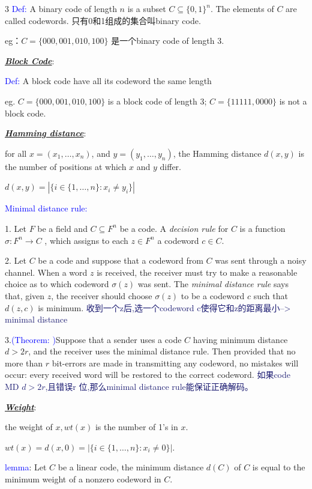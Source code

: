 \documentclass[12pt]{article}
\newcommand{\bulletPoint}[1]{\underline{\textit{\textbf{#1}}}}
\begin{document}
\begin{multicols*}{3}
\textcolor{blue}{Def:} A binary code of length $n$ is a subset $C \subseteq \{0,1\}^n$. The elements of $C$ are called codewords.
只有0和1组成的集合叫binary code. 

eg：$C=\{000, 001, 010, 100\}$ 是一个binary code of length 3.

\bulletPoint{Block Code}: 

\textcolor{blue}{Def:} A block code have all its codeword the same length

eg. $C=\{000, 001, 010, 100\}$ is a block code of length 3; $C=\{11111, 0000\}$ is not a block code.


\bulletPoint{Hamming distance}:

for all $x=(x_1,\dots,x_n)$, and $y=(y_1,\dots,y_n)$, the Hamming distance $d(x,y)$ is the number of positions at which $x$ and $y$ differ.

$d(x,y)=|\{i \in\{1,\ldots,n\}: x_i \neq y_i\}|$

\textcolor{blue}{Minimal distance rule:}

1. Let $F$ be a field and $C \subseteq F^n$ be a code. 
A \textit{decision rule} for $C$ is a function
$
\sigma:F^n \to C
$
, which assigns to each $z\in F^n$ a codeword $c\in C$.

2. Let $C$ be a code and suppose that a codeword from $C$ was sent through a noisy channel. 
When a word $z$ is received, the receiver must try to make a reasonable choice as to which codeword $\sigma(z)$ was sent. 
The \textit{minimal distance rule} says that, given $z$, the receiver should choose $\sigma(z)$ to be a codeword $c$ such that
$
d(z,c)
$
is minimum. {\fontsize{5.5pt}{5pt}\selectfont\textcolor{MidnightBlue}{收到一个z后,选一个codeword c使得它和z的距离最小--> minimal distance}}

3.\textcolor{blue}{(Theorem: )}Suppose that a sender uses a code $C$ having minimum distance $d>2r$, and the receiver uses the minimal distance rule. 
Then provided that no more than $r$ bit-errors are made in transmitting any codeword, no mistakes will occur: every received word will be restored to the correct codeword.
{\fontsize{5.5pt}{5pt}\selectfont\textcolor{MidnightBlue}{如果code MD $d>2r$,且错误r 位,那么minimal distance rule能保证正确解码。}}

\bulletPoint{Weight}:

the weight of $x, wt(x)$ is the number of 1's in $x$.

$wt(x)=d(x,0)=\left|\{i\in\{1,\ldots,n\}:x_i\neq 0\}\right|.$

\textcolor{blue}{lemma}: Let $C$ be a linear code, 
the minimum distance $d(C)$ of $C$ is equal to the minimum weight of a nonzero codeword in $C$.



\end{multicols*}
\end{document}
